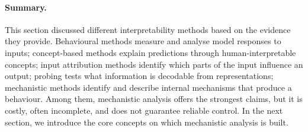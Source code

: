 \paragraph{Summary.} This section discussed different interpretability methods based on the evidence they provide. Behavioural methods measure and analyse model responses to inputs; concept-based methods explain predictions through human-interpretable concepts; input attribution methods identify which parts of the input influence an output; probing tests what information is decodable from representations; mechanistic methods identify and describe internal mechanisms that produce a behaviour. Among them, mechanistic analysis offers the strongest claims, but it is costly, often incomplete, and does not guarantee reliable control. In the next section, we introduce the core concepts on which mechanistic analysis is built.
